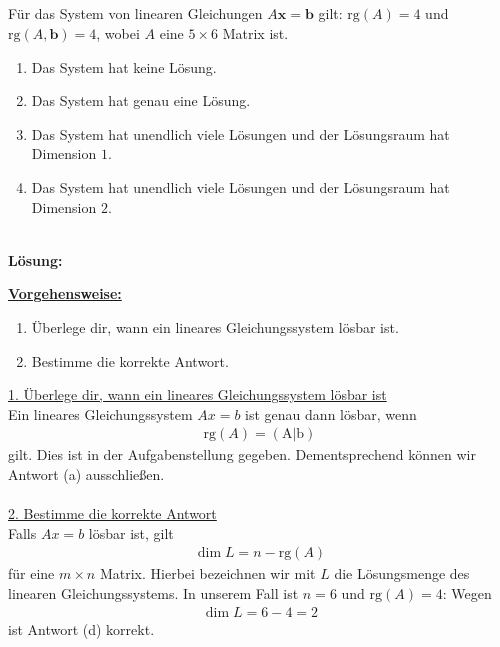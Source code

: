 \subsection*{}
Für das System von linearen Gleichungen $A \textbf{x} = \textbf{b}$ gilt:
$\text{rg}(A) = 4$ und $\text{rg}(A,\textbf{b}) = 4$, wobei $A$ eine $5 \times 6$ Matrix ist.
\renewcommand{\labelenumi}{(\alph{enumi})}
\begin{enumerate}
\item 
Das System hat keine Lösung.
\item
Das System hat genau eine Lösung.
\item
Das System hat unendlich viele Lösungen und der Lösungsraum hat Dimension $1$.
\item
Das System hat unendlich viele Lösungen und der Lösungsraum hat Dimension $2$.
\end{enumerate}
\ \\
\textbf{Lösung:}
\begin{mdframed}
\underline{\textbf{Vorgehensweise:}}
\renewcommand{\labelenumi}{\theenumi.}
\begin{enumerate}
\item Überlege dir, wann ein lineares Gleichungssystem lösbar ist.
\item Bestimme die korrekte Antwort.
\end{enumerate}
\end{mdframed}

\underline{1. Überlege dir, wann ein lineares Gleichungssystem lösbar ist}\\
Ein lineares Gleichungssystem $ A x  = b$ ist genau dann lösbar, wenn
\begin{align*}
\mathrm{rg}(A) = \mathrm{(A| b) }
\end{align*}
gilt.
Dies ist in der Aufgabenstellung gegeben.
Dementsprechend können wir Antwort (a) ausschließen.\\
\\

\underline{2. Bestimme die korrekte Antwort}\\
Falls $Ax = b$ lösbar ist, gilt
\begin{align*}
\dim L = n - \mathrm{rg}(A)
\end{align*}
für eine $m \times n $ Matrix.
Hierbei bezeichnen wir mit $L$ die Lösungsmenge des linearen Gleichungssystems.
In unserem Fall ist $n = 6$ und $\mathrm{rg}(A)  =4$:
Wegen
\begin{align*}
\dim L = 6 - 4 = 2
\end{align*}
ist Antwort (d) korrekt.


